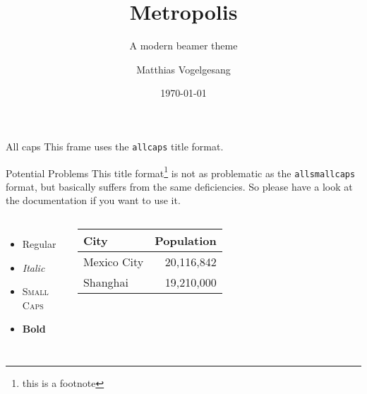 \documentclass[10pt]{beamer}
\title{Metropolis}
\subtitle{A modern beamer theme}
\date{\today}
\author{Matthias Vogelgesang}
\institute{Center for modern beamer themes}
\begin{document}

\begin{frame}{All caps}
	This frame uses the \texttt{allcaps} title format.

	\begin{block}{Potential Problems}
		This title format\footnote{this is a footnote} is not as problematic as the \texttt{allsmallcaps} format, but basically suffers from the same deficiencies. \alert{So please have a look at the documentation if you want to use it.}
	\end{block}
  \begin{columns}[T,onlytextwidth]
	  \begin{itemize}
    \item Regular
    \item \textit{Italic}
    \item \textsc{Small Caps}
    \item \textbf{Bold}
      \end{itemize}
      \begin{table}
    \begin{tabular}{@{} lr @{}}
      \toprule
      City & Population\\
      \midrule
      Mexico City & 20,116,842\\
      Shanghai & 19,210,000\\
      \bottomrule
    \end{tabular}
  \end{table}
      \end{columns}

\end{frame}
\end{document}
